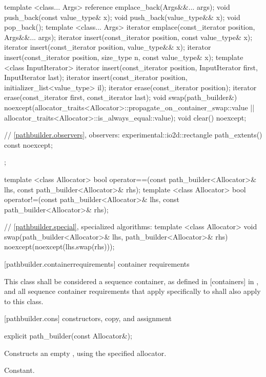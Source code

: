 \begin{codeblock}
{{{{{    template <class... Args>
    reference emplace_back(Args&&... args);
    void push_back(const value_type& x);
    void push_back(value_type&& x);
    void pop_back();
    template <class... Args>
    iterator emplace(const_iterator position, Args&&... args);
    iterator insert(const_iterator position, const value_type& x);
    iterator insert(const_iterator position, value_type&& x);
    iterator insert(const_iterator position, size_type n, const value_type& x);
    template <class InputIterator>
    iterator insert(const_iterator position, InputIterator first,
      InputIterator last);
    iterator insert(const_iterator position,
      initializer_list<value_type> il);
    iterator erase(const_iterator position);
    iterator erase(const_iterator first, const_iterator last);
    void swap(path_builder&)
      noexcept(allocator_traits<Allocator>::propagate_on_container_swap::value 
        || allocator_traits<Allocator>::is_always_equal::value);
    void clear() noexcept;

    // \ref{pathbuilder.observers}, observers:
    experimental::io2d::rectangle path_extents() const noexcept;
  };
  
  template <class Allocator>
  bool operator==(const path_builder<Allocator>& lhs, 
    const path_builder<Allocator>& rhs);
  template <class Allocator>
  bool operator!=(const path_builder<Allocator>& lhs, 
    const path_builder<Allocator>& rhs);
  
  // \ref{pathbuilder.special}, specialized algorithms:
  template <class Allocator>
  void swap(path_builder<Allocator>& lhs, path_builder<Allocator>& rhs)
    noexcept(noexcept(lhs.swap(rhs)));
} } } }
\end{codeblock}

 [pathbuilder.containerrequirements] { container requirements}

\pnum
This class shall be considered a sequence container, as defined in [containers] in \cppseventeen, and all sequence container requirements that apply specifically to  shall also apply to this class.

 [pathbuilder.cons] { constructors, copy, and assignment}

\begin{itemdecl}
explicit path_builder(const Allocator&);
\end{itemdecl}
\begin{itemdescr}
\pnum
\effects
Constructs an empty , using the specified allocator.

\pnum
\complexity
Constant.
\end{itemdescr}

